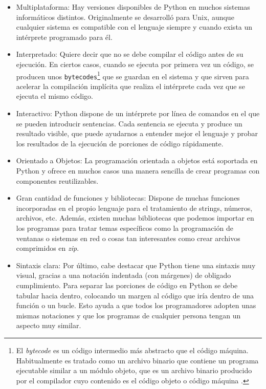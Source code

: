 \documentclass[a4paper, 12pt]{book}
\begin{document}
\begin{itemize}
\item Multiplataforma: Hay versiones disponibles de Python en muchos sistemas informáticos distintos. Originalmente se desarrolló para Unix, aunque cualquier sistema es compatible con el lenguaje siempre y cuando exista un intérprete programado para él.

\item Interpretado: Quiere decir que no se debe compilar el código antes de su ejecución. En ciertos casos, cuando se ejecuta por primera vez un código, se producen unos \texttt{bytecodes}\footnote{El \emph{bytecode} es un código intermedio más abstracto que el código máquina. Habitualmente es tratado como un archivo binario que contiene un programa ejecutable similar a un módulo objeto, que es un archivo binario producido por el compilador cuyo contenido es el código objeto o código máquina .} que se guardan en el sistema y que sirven para acelerar la compilación implícita que realiza el intérprete cada vez que se ejecuta el mismo código.

\item Interactivo: Python dispone de un intérprete por línea de comandos en el que se pueden introducir sentencias. Cada sentencia se ejecuta y produce un resultado visible, que puede ayudarnos a entender mejor el lenguaje y probar los resultados de la ejecución de porciones de código rápidamente.

\item Orientado a Objetos: La programación orientada a objetos está soportada en Python y ofrece en muchos casos una manera sencilla de crear programas con componentes reutilizables.

\item Gran cantidad de funciones y bibliotecas: Dispone de muchas funciones incorporadas en el propio lenguaje para el tratamiento de strings, números, archivos, etc. Además, existen muchas bibliotecas que podemos importar en los programas para tratar temas específicos como la programación de ventanas o sistemas en red o cosas tan interesantes como crear archivos comprimidos en \emph{zip}.

\item Sintaxis clara: Por último, cabe destacar que Python tiene una sintaxis muy visual, gracias a una notación indentada (con márgenes) de obligado cumplimiento. Para separar las porciones de código en Python se debe tabular hacia dentro, colocando un margen al código que iría dentro de una función o un bucle. Esto ayuda a que todos los programadores adopten unas mismas notaciones y que los programas de cualquier persona tengan un aspecto muy similar.
\end{itemize}
\end{document}
